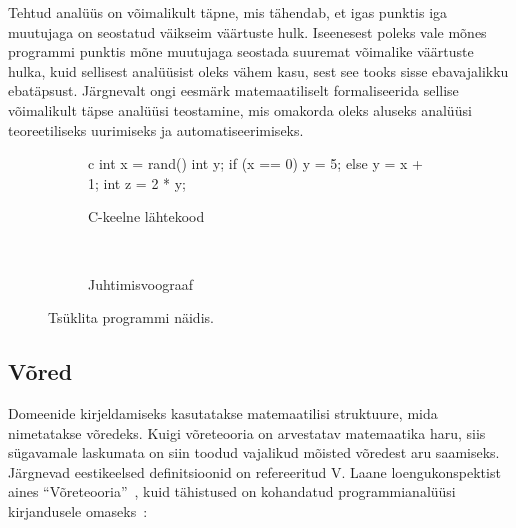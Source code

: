 \documentclass[../thesis.tex]{subfiles}
\begin{document}
Tehtud analüüs on võimalikult täpne, mis tähendab, et igas punktis iga muutujaga on seostatud väikseim väärtuste hulk. Iseenesest poleks vale mõnes programmi punktis mõne muutujaga seostada suuremat võimalike väärtuste hulka, kuid sellisest analüüsist oleks vähem kasu, sest see tooks sisse ebavajalikku ebatäpsust.
Järgnevalt ongi eesmärk matemaatiliselt formaliseerida sellise võimalikult täpse analüüsi teostamine, mis omakorda oleks aluseks analüüsi teoreetiliseks uurimiseks ja automatiseerimiseks.

\begin{figure}
	\centering
	\begin{subfigure}[b]{0.4\textwidth}
		\centering
		\begin{bminted}{c}
			int x = rand() %
			int y;
			if (x == 0)
				y = 5;
			else
				y = x + 1;
			int z = 2 * y;
		\end{bminted}
		\caption{C-keelne lähtekood}
	\end{subfigure}
	~
	\begin{subfigure}[b]{0.4\textwidth}
		\centering
		\caption{Juhtimisvoograaf}
	\end{subfigure}

	\caption{Tsüklita programmi näidis.}
	\label{fig:prog-if}
\end{figure}


\subsection{Võred}
Domeenide kirjeldamiseks kasutatakse matemaatilisi struktuure, mida nimetatakse võredeks. Kuigi võreteooria on arvestatav matemaatika haru, siis sügavamale laskumata on siin toodud vajalikud mõisted võredest aru saamiseks.
Järgnevad eestikeelsed definitsioonid on refereeritud V. Laane loengukonspektist aines \enquote{Võreteooria}~\cite{laan_voreteooria}, kuid tähistused on kohandatud programmianalüüsi kirjandusele omaseks~\cites[17]{seidl_foundations}{vojdani_magister}:
\end{document}
